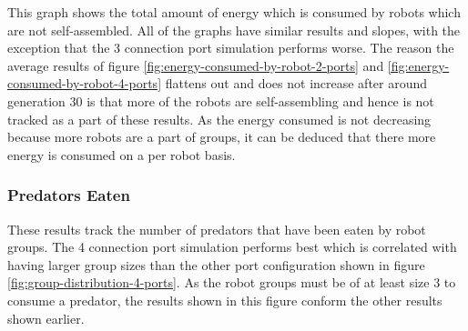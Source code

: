 
This graph shows the total amount of energy which is consumed by robots which are not self-assembled.
All of the graphs have similar results and slopes, with the exception that the 3 connection port simulation performs worse.
The reason the average results of figure \ref{fig:energy-consumed-by-robot-2-ports} and \ref{fig:energy-consumed-by-robot-4-ports} flattens out and does not increase after around generation 30 is that more of the robots are self-assembling and hence is not tracked as a part of these results.
As the energy consumed is not decreasing because more robots are a part of groups, it can be deduced that there more energy is consumed on a per robot basis.

\vspace*{\fill}
\newpage
\vspace*{\fill}
\begin{center}
	\subsubsection{Predators Eaten}
	\vspace*{-0.6cm}
\end{center}


These results track the number of predators that have been eaten by robot groups. 
The 4 connection port simulation performs best which is correlated with having larger group sizes than the other port configuration shown in figure \ref{fig:group-distribution-4-ports}.
As the robot groups must be of at least size 3 to consume a predator, the results shown in this figure conform the other results shown earlier.

\vspace*{\fill}
